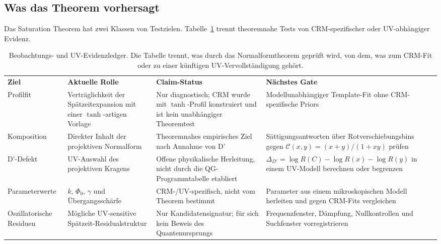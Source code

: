 \documentclass[aps,prd,twocolumn,superscriptaddress,nofootinbib]{revtex4-2}
\begin{document}
\subsection{Was das Theorem vorhersagt}

Das Saturation Theorem hat zwei Klassen von Testzielen. Tabelle~\ref{tab:observational_ledger} trennt theoremnahe Tests von CRM-spezifischer oder UV-abhängiger Evidenz.

\begin{table}[t]
\caption{Beobachtungs- und UV-Evidenzledger. Die Tabelle trennt, was durch das Normalformtheorem geprüft wird, von dem, was zum CRM-Fit oder zu einer künftigen UV-Vervollständigung gehört.}
\label{tab:observational_ledger}
\small
\begin{ruledtabular}
\begin{tabular}{@{}llll@{}}
\parbox[t]{0.14\textwidth}{\textbf{Ziel}} & \parbox[t]{0.24\textwidth}{\textbf{Aktuelle Rolle}} & \parbox[t]{0.25\textwidth}{\textbf{Claim-Status}} & \parbox[t]{0.28\textwidth}{\textbf{Nächstes Gate}} \\
\parbox[t]{0.14\textwidth}{Profilfit} & \parbox[t]{0.24\textwidth}{Verträglichkeit der Spätzeitexpansion mit einer $\tanh$-artigen Vorlage} & \parbox[t]{0.25\textwidth}{Nur diagnostisch; CRM wurde mit $\tanh$-Profil konstruiert und ist kein unabhängiger Theoremtest} & \parbox[t]{0.28\textwidth}{Modellunabhängiger Template-Fit ohne CRM-spezifische Priors} \\[0.6em]
\parbox[t]{0.14\textwidth}{Komposition} & \parbox[t]{0.24\textwidth}{Direkter Inhalt der projektiven Normalform} & \parbox[t]{0.25\textwidth}{Theoremnahes empirisches Ziel nach Annahme von D'} & \parbox[t]{0.28\textwidth}{Sättigungsantworten über Rotverschiebungsbins gegen $\mathcal{C}(x,y)=(x+y)/(1+xy)$ prüfen} \\[0.6em]
\parbox[t]{0.14\textwidth}{D'-Defekt} & \parbox[t]{0.24\textwidth}{UV-Auswahl des projektiven Kragens} & \parbox[t]{0.25\textwidth}{Offene physikalische Herleitung, nicht durch die QG-Programmtabelle etabliert} & \parbox[t]{0.28\textwidth}{$\Delta_{D'}=\log R(C)-\log R(x)-\log R(y)$ in einem UV-Modell berechnen oder begrenzen} \\[0.6em]
\parbox[t]{0.14\textwidth}{Parameterwerte} & \parbox[t]{0.24\textwidth}{$k$, $\Phi_0$, $\gamma$ und Übergangsschärfe} & \parbox[t]{0.25\textwidth}{CRM-/UV-spezifisch, nicht vom Theorem bestimmt} & \parbox[t]{0.28\textwidth}{Parameter aus einem mikroskopischen Modell herleiten und gegen CRM-Fits vergleichen} \\[0.6em]
\parbox[t]{0.14\textwidth}{Oszillatorische Residuen} & \parbox[t]{0.24\textwidth}{Mögliche UV-sensitive Spätzeit-Residualstruktur} & \parbox[t]{0.25\textwidth}{Nur Kandidatensignatur; für sich kein Beweis des Quantenursprungs} & \parbox[t]{0.28\textwidth}{Frequenzfenster, Dämpfung, Nullkontrollen und Suchfenster vorregistrieren} \\
\end{tabular}
\end{ruledtabular}
\end{table}
\end{document}
